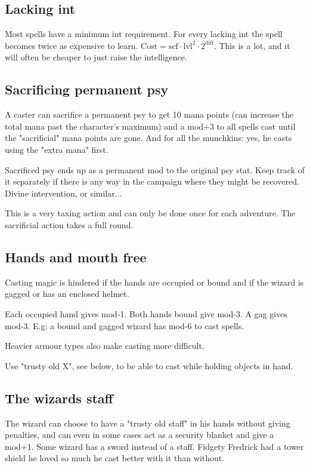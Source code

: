 \subsection*{Lacking int}
Most spells have a minimum int requirement. For every lacking int the spell becomes twice as expensive to learn. $\mathrm{Cost} = \mathrm{scf} \cdot \mathrm{lvl}^2 \cdot 2^{\mathrm{diff}}$. This is a lot, and it will often be cheaper to just raise the intelligence.


\subsection*{Sacrificing permanent psy}
A caster can sacrifice a permanent psy to get 10 mana points (can increase the total mana past the character's maximum) and a mod+3 to all spells cast until the "sacrificial" mana points are gone. And for all the munchkins: yes, he casts using the "extra mana" first.

Sacrificed psy ends up as a permanent mod to the original psy stat. Keep track of it separately if there is any way in the campaign where they might be recovered. Divine intervention, or similar...

This is a very taxing action and can only be done once for each adventure. The sacrificial action takes a full round.


\subsection*{Hands and mouth free}
Casting magic is hindered if the hands are occupied or bound and if the wizard is gagged or has an enclosed helmet.

Each occupied hand gives mod-1. Both hands bound give mod-3. A gag gives mod-3.
E.g: a bound and gagged wizard has mod-6 to cast spells.

Heavier armour types also make casting more difficult.

Use "trusty old X", see below, to be able to cast while holding objects in hand.


\subsection*{The wizards staff}
The wizard can choose to have a "trusty old staff" in his hands without giving penalties, and can even in some cases act as a security blanket and give a mod+1. Some wizard has a sword instead of a staff. Fidgety Fredrick had a tower shield he loved so much he cast better with it than without.

